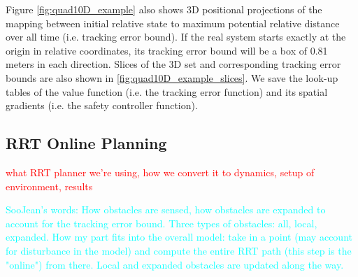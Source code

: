 Figure \ref{fig:quad10D_example} also shows 3D positional projections of the mapping between initial relative state to maximum potential relative distance over all time (i.e. tracking error bound). If the real system starts exactly at the origin in relative coordinates, its tracking error bound will be a box of 0.81 meters in each direction. Slices of the 3D set and corresponding tracking error bounds are also shown in \ref{fig:quad10D_example_slices}. We save the look-up tables of the value function (i.e. the tracking error function) and its spatial gradients (i.e. the safety controller function).

\subsection{RRT Online Planning}
\textcolor{red}{what RRT planner we're using, how we convert it to dynamics, setup of environment, results}

\textcolor{cyan}{SooJean's words: How obstacles are sensed, how obstacles are expanded to account for the tracking error bound. Three types of obstacles: all, local, expanded. How my part fits into the overall model: take in a point (may account for disturbance in the model) and compute the entire RRT path (this step is the "online") from there. Local and expanded obstacles are updated along the way.}